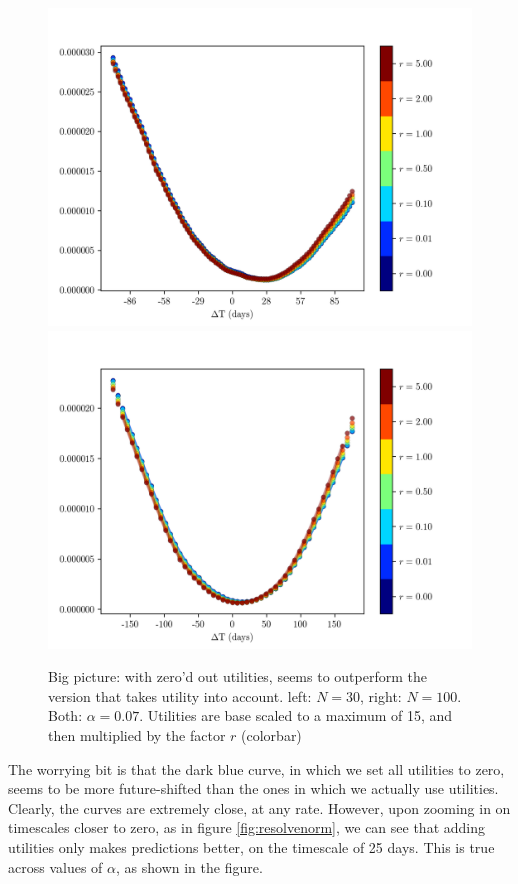 \documentclass{article}
\theoremstyle{definition}
\begin{document}
	\begin{figure}[h!]
		\includegraphics[width=0.5\linewidth]{figs/uscale/G2D30_a07_big.png}
		\includegraphics[width=0.5\linewidth]{figs/uscale/G1W100_a07_big.png}
		\caption{\color{darkgray} Big picture: with zero'd out utilities, seems to outperform the version that takes utility into account. left: $N = 30$, right: $N=100$. Both: $\alpha = 0.07$. Utilities are base scaled to a maximum of 15, and then multiplied by the factor $r$ (colorbar)}\label{fig:normproblem}
	\end{figure}

	The worrying bit is that the dark blue curve, in which we set all utilities to zero, seems to be more future-shifted than the ones in which we actually use utilities. Clearly, the curves are extremely close, at any rate. However, upon zooming in on timescales closer to zero, as in figure \ref{fig:resolvenorm}, we can see that adding utilities only makes predictions better, on the timescale of 25 days. This is true across values of $\alpha$, as shown in the figure.
\end{document}
